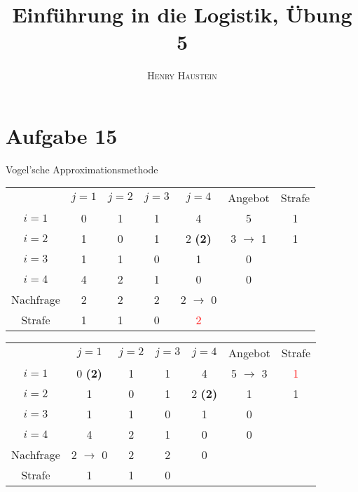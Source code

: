 \documentclass{article}
\title{\textbf{Einführung in die Logistik, Übung 5}}
\author{\textsc{Henry Haustein}}
\date{}
\begin{document}
	\maketitle
	
	\section*{Aufgabe 15}
	Vogel'sche Approximationsmethode
	\begin{center}
		\begin{tabular}{c|cccc|cc}
			& $j=1$ & $j=2$ & $j=3$ & $j=4$ & Angebot & Strafe \\
			\cline{1-6}
			$i=1$ & 0 & 1 & 1 & 4 & 5 & 1 \\
			$i=2$ & 1 & 0 & 1 & 2 \textbf{(2)} & 3 $\to$ 1 & 1 \\
			\rowcolor{blue!30}$i=3$ & 1 & 1 & 0 & 1 & 0 & \\
			\rowcolor{blue!30}$i=4$ & 4 & 2 & 1 & 0 & 0 & \\
			\cline{1-6}
			Nachfrage & 2 & 2 & 2 & 2 $\to$ 0 & & \\
			Strafe & 1 & 1 & 0 & \textcolor{red}{2} & &
		\end{tabular}
	\end{center}
	\begin{center}
		\begin{tabular}{c|cccc|cc}
			& $j=1$ & $j=2$ & $j=3$ & \cellcolor{blue!30}$j=4$ & Angebot & Strafe \\
			\cline{1-6}
			$i=1$ & 0 \textbf{(2)} & 1 & 1 & \cellcolor{blue!30}4 & 5 $\to$ 3 & \textcolor{red}{1} \\
			$i=2$ & 1 & 0 & 1 & \cellcolor{blue!30}2 \textbf{(2)} & 1 & 1 \\
			\rowcolor{blue!30}$i=3$ & 1 & 1 & 0 & \cellcolor{blue!30}1 & 0 & \\
			\rowcolor{blue!30}$i=4$ & 4 & 2 & 1 & \cellcolor{blue!30}0 & 0 & \\
			\cline{1-6}
			Nachfrage & 2 $\to$ 0 & 2 & 2 & \cellcolor{blue!30}0 & & \\
			Strafe & 1 & 1 & 0 & \cellcolor{blue!30} & &
		\end{tabular}
	\end{center}
\end{document}
